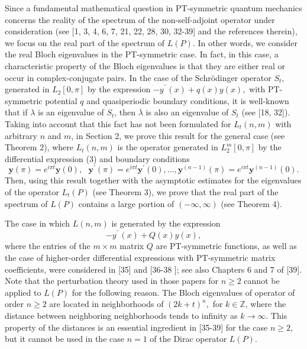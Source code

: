 \documentclass{article}%
\begin{document}
Since a fundamental mathematical question in PT-symmetric quantum mechanics
concerns the reality of the spectrum of the non-self-adjoint operator under
consideration (see [1, 3, 4, 6, 7, 21, 22, 28, 30, 32-39] and the references
therein), we focus on the real part of the spectrum of $L(P)$. In other words,
we consider the real Bloch eigenvalues in the PT-symmetric case. In fact, in
this case, a characteristic property of the Bloch eigenvalues is that they are
either real or occur in complex-conjugate pairs. In the case of the
Schr\"{o}dinger operator $S_{t},$ generated in $L_{2}[0,\pi]$ by the
expression $-y^{^{\prime\prime}}(x)+q\left(  x\right)  y(x),$ with
PT-symmetric potential $q$ and quasiperiodic boundary conditions, it is
well-known that if $\lambda$ is an eigenvalue of $S_{t}$, then $\overline
{\lambda}$ is also an eigenvalue of $S_{t}$ (see [18, 32]). Taking into
account that this fact has not been formulated for $L_{t}(n,m)$ with arbitrary
$n$ and $m$, in Section 2, we prove this result for the general case (see
Theorem 2), where $L_{t}(n,m)$ is the operator generated in $L_{2}^{m}[0,\pi]$
by the differential expression (3) and boundary conditions
\begin{equation}
\mathbf{y}(\pi)=e^{i\pi t}\mathbf{y}(0),\text{ }\mathbf{y}^{\prime}%
(\pi)=e^{i\pi t}\mathbf{y}^{\prime}(0),...,\mathbf{y}^{(n-1)}(\pi)=e^{i\pi
t}\mathbf{y}^{(n-1)}(0).\tag{6}%
\end{equation}
Then, using this result together with the asymptotic estimates for the
eigenvalues of the operator $L_{t}(P)$ (see Theorem 3), we prove that the real
part of the spectrum of $L(P)$ contains a large portion of $(-\infty,\infty)$
(see Theorem 4).

The case in which $L(n,m)$ is generated by the expression
\[
-y^{^{\prime\prime}}(x)+Q\left(  x\right)  y(x),
\]
where the entries of the $m\times m$ matrix $Q$ are PT-symmetric functions, as
well as the case of higher-order differential expressions with PT-symmetric
matrix coefficients, were considered in [35] and [36-38 ]; see also Chapters 6
and 7 of [39]. Note that the perturbation theory used in those papers for
$n\geq2$ cannot be applied to $L(P)$ for the following reason. The Bloch
eigenvalues of operator of order $n\geq2$ are located in neighborhoods of
$(2k+t)^{n},$ for $k\in\mathbb{Z}$, where the distance between neighboring
neighborhoods tends to infinity as $k\rightarrow\infty.$ This property of the
distances is an essential ingredient in [35-39] for the case $n\geq2$, but it
cannot be used in the case $n=1$ of the Dirac operator $L(P)$.
\end{document}
